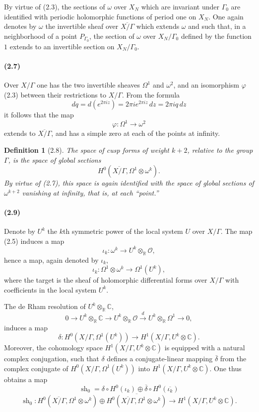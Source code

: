 \documentclass[10pt]{article}
\newcommand{\C}{\mathbb C}
\newcommand{\R}{\mathbb R}
\newcommand{\cO}{\mathcal O}
\newcommand{\sh}{\operatorname{sh}}
\newtheorem*{definition}{Definition}
\begin{document}
By virtue of (2.3), the sections of $\omega$ over $X_N$ which are invariant under
$\Gamma_0$ are identified with periodic holomorphic functions of period one on $X_N$.
One again denotes by $\omega$ the invertible sheaf over $\overline{X/\Gamma}$ which
extends $\omega$ and such that, in a neighborhood of a point $P_{\Gamma_0}$, the section
of $\omega$ over $X_N/\Gamma_0$ defined by the function $1$ extends to an invertible
section on $X_N/\Gamma_0$.

\paragraph{(2.7)}
Over $X/\Gamma$ one has the two invertible sheaves $\Omega^1$ and $\omega^2$, and
an isomorphism $\varphi$ (2.3) between their restrictions to $X/\Gamma$. From the formula
\[
dq=d(e^{2\pi iz})=2\pi i e^{2\pi iz}\,dz=2\pi iq\,dz
\]
it follows that the map
\[
\varphi:\Omega^1\to \omega^2
\]
extends to $\overline{X/\Gamma}$, and has a simple zero at each of the points at infinity.

\begin{definition}[2.8]
The space of cusp forms of weight $k+2$, relative to the group $\Gamma$, is the space of
global sections
\[
H^0(\overline{X/\Gamma},\Omega^1\otimes\omega^k).
\]
By virtue of (2.7), this space is again identified with the space of global sections of
$\omega^{k+2}$ vanishing at infinity, that is, at each ``point.''
\end{definition}

\paragraph{(2.9)}
Denote by $U^k$ the $k$th symmetric power of the local system $U$ over $X/\Gamma$.
The map (2.5) induces a map
\[
\iota_k:\omega^k\to U^k\otimes_\R\cO,
\]
hence a map, again denoted by $\iota_k$,
\[
\iota_k:\Omega^1\otimes\omega^k\to \Omega^1(U^k),
\]
where the target is the sheaf of holomorphic differential forms over $X/\Gamma$ with
coefficients in the local system $U^k$.

The de Rham resolution of $U^k\otimes_\R\C$,
\[
0\to U^k\otimes_\R\C\to U^k\otimes_\R\cO
\xrightarrow{d}U^k\otimes_\R\Omega^1\to 0,
\]
induces a map
\[
\delta:H^0(X/\Gamma,\Omega^1(U^k))\to H^1(X/\Gamma,U^k\otimes\C).
\]
Moreover, the cohomology space $H^1(X/\Gamma,U^k\otimes\C)$ is equipped with a
natural complex conjugation, such that $\delta$ defines a conjugate-linear mapping
$\overline{\delta}$ from the complex conjugate of $H^0(X/\Gamma,\Omega^1(U^k))$ into
$H^1(X/\Gamma,U^k\otimes\C)$. One thus obtains a map
\[
\sh_0=\delta\circ H^0(\iota_k)\oplus
\overline{\delta}\circ H^0(\overline{\iota_k})
\]
\[
\sh_0:
H^0(\overline{X/\Gamma},\Omega^1\otimes\omega^k)
\oplus
\overline{H^0(\overline{X/\Gamma},\Omega^1\otimes\omega^k)}
\longrightarrow
H^1(X/\Gamma,U^k\otimes\C).
\]
\end{document}
